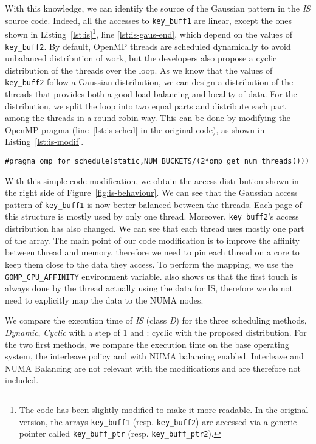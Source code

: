 With this knowledge, we can identify the source of the
Gaussian pattern in the \emph{IS} source code. Indeed, all the accesses to \texttt{key\_buff1} are linear,
except the ones shown in Listing~\ref{lst:is}\footnote{
    The code has been slightly modified to make it more readable. In the
    original version, the arrays \texttt{key\_buff1} (resp. \texttt{key\_buff2})
    are accessed via a generic pointer called \texttt{key\_buff\_ptr} (resp.
    \texttt{key\_buff\_ptr2}).
}, line \ref{lst:is-gaus-end}, which depend on the values of
\texttt{key\_buff2}.
By default, OpenMP threads are scheduled dynamically to avoid unbalanced
distribution of work, but the developers also propose a cyclic distribution
of the threads over the loop. As we know that the values of \texttt{key\_buff2}
follow a Gaussian distribution, we can design a distribution of the threads that
provides both a good load balancing and locality of data. For the distribution, we split
the loop into two equal parts and distribute each part among the threads in a round-robin way. This can be done by modifying the OpenMP pragma (line~\ref{lst:is-sched} in the original code), as shown
in Listing~\ref{lst:is-modif}.

\begin{lstlisting}[float=!h,caption=Optimization for \emph{IS}., label=lst:is-modif]
#pragma omp for schedule(static,NUM_BUCKETS/(2*omp_get_num_threads()))
\end{lstlisting}



With this simple code modification, we obtain the access distribution
shown in the right side of Figure~\ref{fig:is-behaviour}. We can see that the Gaussian
access pattern of \texttt{key\_buff1} is now better balanced between the threads. Each page
of this structure is mostly used by only one thread. Moreover,
\texttt{key\_buff2}'s access distribution has also changed. We can see that
each thread uses mostly one part of the array.
The main point of our code modification is to improve the affinity between
thread and memory, therefore we need to pin each thread on a core to keep them
close to the data they access. To perform the mapping, we use the \texttt{GOMP\_CPU\_AFFINITY} environment variable. \TABARNAC
also shows us that the first touch is always done by the thread actually using
the data for IS, therefore we do not need to explicitly map the data to the NUMA nodes.

We compare the execution time of \emph{IS} (class \emph{D}) for the three scheduling
methods, \emph{Dynamic}, \emph{Cyclic} with a step of $1$ and \TABARNAC:
cyclic with the proposed distribution. For the two first methods, we compare the
execution time on the base operating system, the interleave policy and with NUMA balancing enabled. Interleave and NUMA Balancing are not relevant with the
\TABARNAC modifications and are therefore not included.

